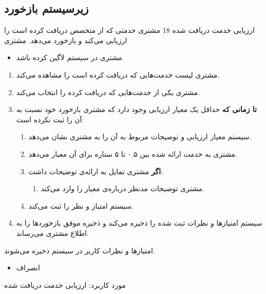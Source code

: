 
\newpage

\subsection{زیرسیستم بازخورد}

\usecase
{
	ارزیابی خدمت دریافت شده
}
{18}
{
	مشتری خدمتی که از متخصص دریافت کرده است را ارزیابی می‌کند و بازخورد می‌دهد.
}
{
	مشتری
}
{}
{
		\begin{itemize}
		\vspace*{-0.6cm}
		\item 
		مشتری در سیستم لاگین کرده باشد.
	\end{itemize}
}
{
	\vspace*{-0.6cm}
	\begin{enumerate}
		\item 
		مشتری لیست خدمت‌‌هایی که دریافت کرده است را مشاهده می‌کند.
		\item
		مشتری یکی از خدمت‌هایی که دریافت کرده را انتخاب می‌کند.
		\item
		\textbf{تا زمانی که} حداقل یک معیار ارزیابی وجود دارد که مشتری بازخورد خود نسبت به آن را ثبت نکرده است:
		
		\begin{enumerate}[label=\theenumi.\arabic*.]
			\item
سیستم معیار ارزیابی و توضیحات مربوط به آن را به مشتری نشان می‌دهد.
			\item 
مشتری به خدمت ارائه شده بین ۰.۵ تا ۵ ستاره برای آن معیار می‌دهد.
			\item 
			\textbf{اگر} مشتری تمایل به ارائه‌ی توضیحات داشت:
			\begin{enumerate}
				\item 
				مشتری توضیحات مدنظر درباره‌ی معیار را وارد می‌کند. 
			\end{enumerate}
			\item 
			سیستم امتیاز و نظر را ثبت می‌کند.
		\end{enumerate}
		\item
		سیستم امتیازها و نظرات ثبت شده را ذخیره می‌کند و ذخیره موفق بازخوردها را به اطلاع مشتری می‌رساند.
		
	\end{enumerate}
}
{
امتیازها و نظرات کاربر در سیستم ذخیره می‌شوند.
}
{
	\begin{itemize}
		\vspace*{-0.6cm}
		\item 
		انصراف
	\end{itemize}
}
{
	مورد کاربرد: ارزیابی خدمت دریافت شده
}




